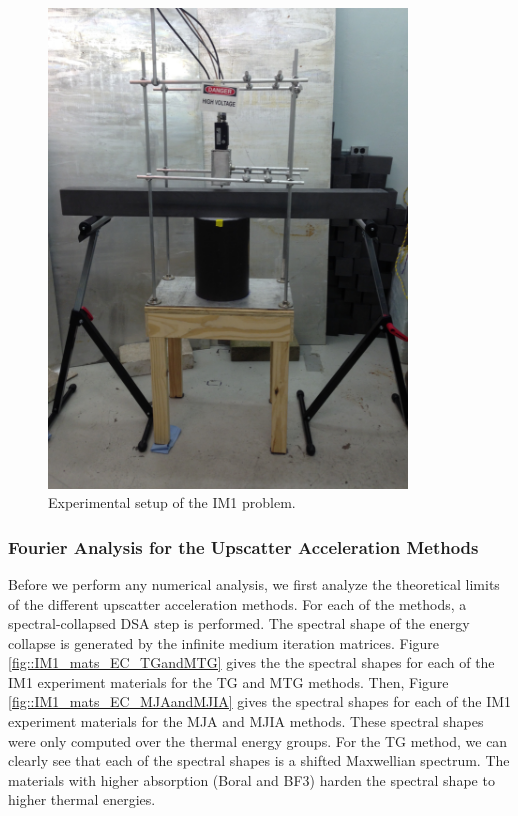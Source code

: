 \begin{figure}
\centering
\includegraphics[width=0.85\textwidth]{figures/sec_DSA/IM1_exp_setup.jpg}
\caption{Experimental setup of the IM1 problem.}
\label{fig::IM1_setup_3D}
\end{figure}




\subsubsection{Fourier Analysis for the Upscatter Acceleration Methods}
\label{sec::DSA_Results_IM1_Fourier}

Before we perform any numerical analysis, we first analyze the theoretical limits of the different upscatter acceleration methods. For each of the methods, a spectral-collapsed DSA step is performed. The spectral shape of the energy collapse is generated by the infinite medium iteration matrices. Figure \ref{fig::IM1_mats_EC_TGandMTG} gives the the spectral shapes for each of the IM1 experiment materials for the TG and MTG methods. Then, Figure \ref{fig::IM1_mats_EC_MJAandMJIA} gives the spectral shapes for each of the IM1 experiment materials for the MJA and MJIA methods. These spectral shapes were only computed over the thermal energy groups. For the TG method, we can clearly see that each of the spectral shapes is a shifted Maxwellian spectrum. The materials with higher absorption (Boral and BF3) harden the spectral shape to higher thermal energies.

